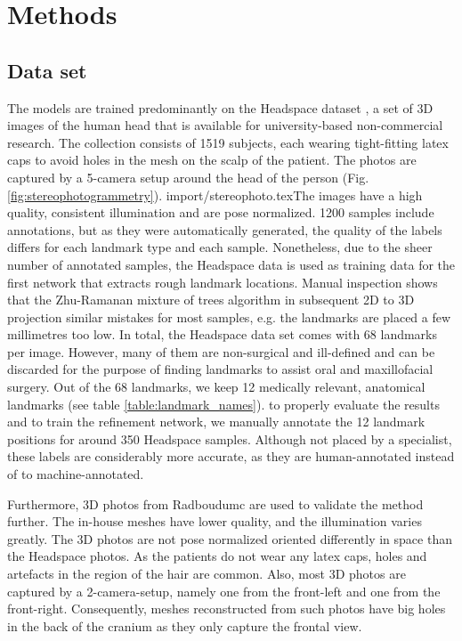 \documentclass[class=article, crop=false]{standalone}
\begin{document}
\section{Methods}
\label{sec:methods}

\subsection{Data set}The models are trained predominantly on the Headspace dataset \cite{Dai2019}, a set of 3D images of the human head that is available for university-based non-commercial research. The collection consists of 1519 subjects, each wearing tight-fitting latex caps to avoid holes in the mesh on the scalp of the patient. The photos are captured by a 5-camera setup around the head of the person (Fig. \ref{fig:stereophotogrammetry}).
{import/stereophoto.tex}The images have a high quality, consistent illumination and are pose normalized. 1200 samples include annotations, but as they were automatically generated, the quality of the labels differs for each landmark type and each sample. Nonetheless, due to the sheer number of annotated samples, the Headspace data is used as training data for the first network that extracts rough landmark locations. Manual inspection shows that the Zhu-Ramanan mixture of trees algorithm in subsequent 2D to 3D projection similar mistakes for most samples, e.g. the landmarks are placed a few millimetres too low. %
In total, the Headspace data set comes with 68 landmarks per image. However, many of them are non-surgical and ill-defined and can be discarded for the purpose of finding landmarks to assist oral and maxillofacial surgery. Out of the 68 landmarks, we keep 12 medically relevant, anatomical landmarks (see table \ref{table:landmark_names}). to properly evaluate the results and to train the refinement network, we manually annotate the 12 landmark positions for around 350 Headspace samples. Although not placed by a specialist, these labels are considerably more accurate, as they are human-annotated instead of to machine-annotated.

Furthermore, 3D photos from Radboudumc are used to validate the method further. The in-house meshes have lower quality, and the illumination varies greatly. The 3D photos are not pose normalized oriented differently in space than the Headspace photos. As the patients do not wear any latex caps, holes and artefacts in the region of the hair are common. Also, most 3D photos are captured by a 2-camera-setup, namely one from the front-left and one from the front-right. Consequently, meshes reconstructed from such photos have big holes in the back of the cranium as they only capture the frontal view.
\end{document}
